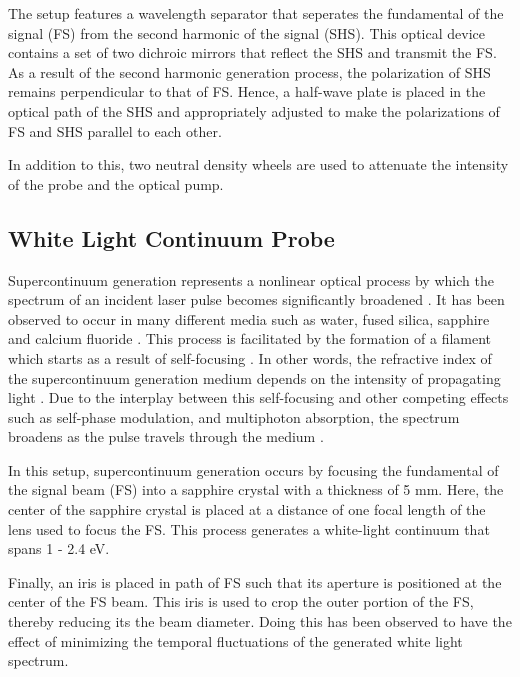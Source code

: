 The setup features a wavelength separator that seperates the fundamental of the signal (FS) from the second harmonic of the signal (SHS). This optical device contains a set of two dichroic mirrors that reflect the SHS and transmit the FS. As a result of the second harmonic generation process, the polarization of SHS remains perpendicular to that of FS. Hence, a half-wave plate is placed in the optical path of the SHS and appropriately adjusted to make the polarizations of FS and SHS parallel to each other. 

In addition to this, two neutral density wheels are used to attenuate the intensity of the probe and the optical pump.

\subsection{White Light Continuum Probe}


\label{section:white_light_probe}
Supercontinuum generation represents a nonlinear optical process by which the spectrum of an incident laser pulse becomes significantly broadened \cite{dubietis2017ultrafast}. It has been observed to occur in many different media such as water, fused silica, sapphire and calcium fluoride \cite{dubietis2017ultrafast}. This process is facilitated by the formation of a filament which starts as a result of self-focusing \cite{dubietis2017ultrafast}. In other words, the refractive index of the supercontinuum generation medium depends on the intensity of propagating light \cite{dubietis2017ultrafast}. Due to the interplay between this self-focusing and other competing effects such as self-phase modulation, and multiphoton absorption, the spectrum  broadens as the pulse travels through the medium \cite{dubietis2017ultrafast}. 

In this setup, supercontinuum generation occurs by focusing the fundamental of the signal beam (FS) into a sapphire crystal with a thickness of 5 mm. Here, the center of the sapphire crystal is placed at a distance of one focal length of the lens used to focus the FS. This process generates a white-light continuum that spans 1 - 2.4 eV. 

Finally, an iris is placed in path of FS such that its aperture is positioned at the center of the FS beam. This iris is used to crop the outer portion of the FS, thereby reducing its the beam diameter. Doing this has been observed to have the effect of minimizing the temporal fluctuations of the generated white light spectrum. 

